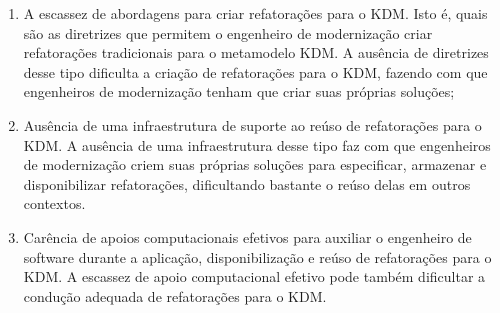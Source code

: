 \begin{enumerate}

\item A escassez de abordagens para criar refatorações para o KDM. Isto é, quais são as diretrizes que permitem o engenheiro de modernização criar refatorações tradicionais para o metamodelo KDM. A ausência de diretrizes desse tipo dificulta a criação de refatorações para o KDM, fazendo com que engenheiros de modernização tenham que criar suas próprias soluções;

\item Ausência de uma infraestrutura de suporte ao reúso de refatorações para o KDM. A ausência de uma infraestrutura desse tipo faz com que engenheiros de modernização criem suas próprias soluções para especificar, armazenar e disponibilizar refatorações, dificultando bastante o reúso delas em outros contextos. 






\item Carência de apoios computacionais efetivos para auxiliar o engenheiro de software durante a aplicação, disponibilização e reúso de refatorações para o KDM. A escassez de apoio computacional efetivo pode também dificultar a condução adequada de refatorações para o KDM.

\end{enumerate}

